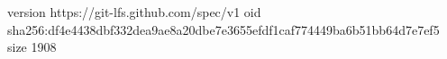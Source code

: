 version https://git-lfs.github.com/spec/v1
oid sha256:df4e4438dbf332dea9ae8a20dbe7e3655efdf1caf774449ba6b51bb64d7e7ef5
size 1908

